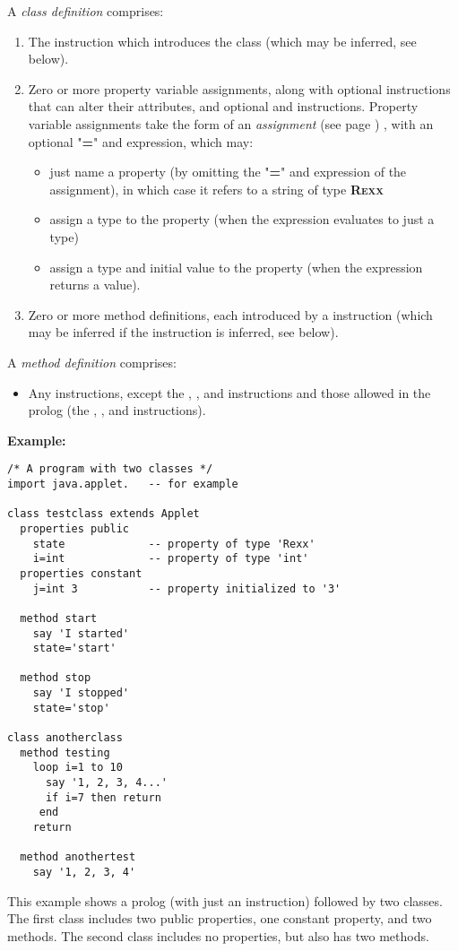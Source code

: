 A \emph{class definition} comprises:
\begin{enumerate}
\item The  instruction which introduces the class (which may
be inferred, see below).
\item 
Zero or more property variable assignments,
along with optional 
instructions that can alter their attributes, and optional
 and  instructions.
Property variable assignments take the form of an
 \emph{assignment} (see page \pageref{refassign}) , with an optional
"\textbf{=}" and expression, which may:
\begin{itemize}
\item just name a property (by omitting the "\textbf{=}"
and expression of the assignment), in which case it refers to a string of
type \textbf{R\textsc{exx}}
\item assign a type to the property (when the expression evaluates to just
a type)
\item 
assign a type and initial value to the property (when the expression
returns a value).
\end{itemize}
\item Zero or more method definitions, each introduced by a
 instruction (which may be inferred if the 
instruction is inferred, see below).
\end{enumerate}
 
A \emph{method definition} comprises:
\begin{itemize}
\item 
Any \nr{} instructions, except the , ,
and  instructions and those allowed in the prolog
(the , , and 
instructions).
\end{itemize}
 \textbf{Example:}
\begin{lstlisting}[label=testclass,caption=testclass.nrx]
/* A program with two classes */
import java.applet.   -- for example

class testclass extends Applet
  properties public
    state             -- property of type 'Rexx'
    i=int             -- property of type 'int'
  properties constant
    j=int 3           -- property initialized to '3'

  method start
    say 'I started'
    state='start'

  method stop
    say 'I stopped'
    state='stop'

class anotherclass
  method testing
    loop i=1 to 10
      say '1, 2, 3, 4...'
      if i=7 then return
     end
    return

  method anothertest
    say '1, 2, 3, 4'
\end{lstlisting}
This example shows a prolog (with just an 
instruction) followed by two classes.  The first class includes
two public properties, one constant property, and two methods.
The second class includes no properties, but also has two methods.
 
